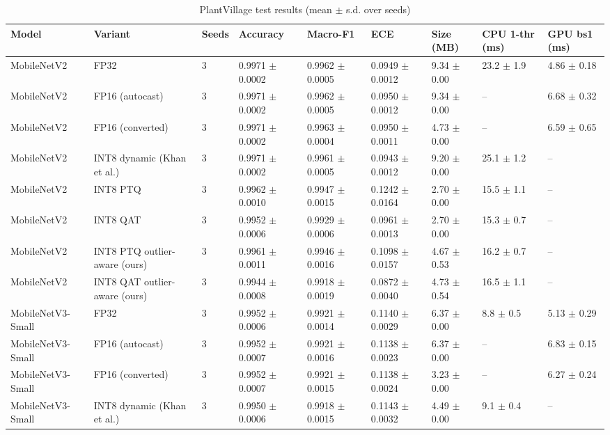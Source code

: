 \begin{table}[t]
\centering
\caption{PlantVillage test results (mean $\pm$ s.d. over seeds)}
\label{tab:tab02_main_results}
\small
\begin{tabular}{lllllllll}
\toprule
Model & Variant & Seeds & Accuracy & Macro-F1 & ECE & Size (MB) & CPU 1-thr (ms) & GPU bs1 (ms) \\
\midrule
MobileNetV2 & FP32 & 3 & 0.9971 $\pm$ 0.0002 & 0.9962 $\pm$ 0.0005 & 0.0949 $\pm$ 0.0012 & 9.34 $\pm$ 0.00 & 23.2 $\pm$ 1.9 & 4.86 $\pm$ 0.18 \\
MobileNetV2 & FP16 (autocast) & 3 & 0.9971 $\pm$ 0.0002 & 0.9962 $\pm$ 0.0005 & 0.0950 $\pm$ 0.0012 & 9.34 $\pm$ 0.00 & – & 6.68 $\pm$ 0.32 \\
MobileNetV2 & FP16 (converted) & 3 & 0.9971 $\pm$ 0.0002 & 0.9963 $\pm$ 0.0004 & 0.0950 $\pm$ 0.0011 & 4.73 $\pm$ 0.00 & – & 6.59 $\pm$ 0.65 \\
MobileNetV2 & INT8 dynamic (Khan et al.) & 3 & 0.9971 $\pm$ 0.0002 & 0.9961 $\pm$ 0.0005 & 0.0943 $\pm$ 0.0012 & 9.20 $\pm$ 0.00 & 25.1 $\pm$ 1.2 & – \\
MobileNetV2 & INT8 PTQ & 3 & 0.9962 $\pm$ 0.0010 & 0.9947 $\pm$ 0.0015 & 0.1242 $\pm$ 0.0164 & 2.70 $\pm$ 0.00 & 15.5 $\pm$ 1.1 & – \\
MobileNetV2 & INT8 QAT & 3 & 0.9952 $\pm$ 0.0006 & 0.9929 $\pm$ 0.0006 & 0.0961 $\pm$ 0.0013 & 2.70 $\pm$ 0.00 & 15.3 $\pm$ 0.7 & – \\
MobileNetV2 & INT8 PTQ outlier-aware (ours) & 3 & 0.9961 $\pm$ 0.0011 & 0.9946 $\pm$ 0.0016 & 0.1098 $\pm$ 0.0157 & 4.67 $\pm$ 0.53 & 16.2 $\pm$ 0.7 & – \\
MobileNetV2 & INT8 QAT outlier-aware (ours) & 3 & 0.9944 $\pm$ 0.0008 & 0.9918 $\pm$ 0.0019 & 0.0872 $\pm$ 0.0040 & 4.73 $\pm$ 0.54 & 16.5 $\pm$ 1.1 & – \\
MobileNetV3-Small & FP32 & 3 & 0.9952 $\pm$ 0.0006 & 0.9921 $\pm$ 0.0014 & 0.1140 $\pm$ 0.0029 & 6.37 $\pm$ 0.00 & 8.8 $\pm$ 0.5 & 5.13 $\pm$ 0.29 \\
MobileNetV3-Small & FP16 (autocast) & 3 & 0.9952 $\pm$ 0.0007 & 0.9921 $\pm$ 0.0016 & 0.1138 $\pm$ 0.0023 & 6.37 $\pm$ 0.00 & – & 6.83 $\pm$ 0.15 \\
MobileNetV3-Small & FP16 (converted) & 3 & 0.9952 $\pm$ 0.0007 & 0.9921 $\pm$ 0.0015 & 0.1138 $\pm$ 0.0024 & 3.23 $\pm$ 0.00 & – & 6.27 $\pm$ 0.24 \\
MobileNetV3-Small & INT8 dynamic (Khan et al.) & 3 & 0.9950 $\pm$ 0.0006 & 0.9918 $\pm$ 0.0015 & 0.1143 $\pm$ 0.0032 & 4.49 $\pm$ 0.00 & 9.1 $\pm$ 0.4 & – \\

\end{tabular}
\end{table}
